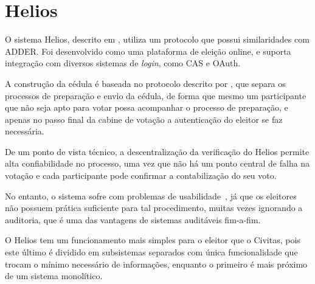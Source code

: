\section{Helios}

O sistema Helios, descrito em \textcite{adida2008helios}, utiliza um protocolo
que possui similaridades com ADDER. Foi desenvolvido como uma plataforma de
eleição online, e suporta integração com diversos sistemas de \textit{login},
como CAS e OAuth.

A construção da cédula é baseada no protocolo descrito por
\textcite{benaloh2006simple}, que separa os processos de preparação e envio da
cédula, de forma que mesmo um participante que não seja apto para votar possa
acompanhar o processo de preparação, e apenas no passo final da cabine de
votação a autenticação do eleitor se faz necessária.

De um ponto de vista técnico, a descentralização da verificação do Helios
permite alta confiabilidade no processo, uma vez que não há um ponto central de
falha na votação e cada participante pode confirmar a contabilização do seu
voto.

No entanto, o sistema sofre com problemas de
usabilidade~\cite{karayumak2011usability}, já que os eleitores não possuem
prática suficiente para tal procedimento, muitas vezes ignorando a auditoria,
que é uma das vantagens de sistemas auditáveis fim-a-fim.

O Helios tem um funcionamento mais simples para o eleitor que o Civitas, pois
este último é dividido em subsistemas separados com única funcionalidade que
trocam o mínimo necessário de informações, enquanto o primeiro é mais próximo
de um sistema monolítico.
